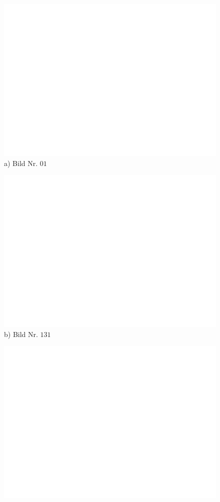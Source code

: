 \begin{figure}[H]
\centering
  \begin{minipage}{0.3\textwidth}
    \includegraphics[width=\textwidth]{images/dummy.png}
    a) Bild Nr. $01$
  \end{minipage}
  \begin{minipage}{0.3\textwidth}
    \includegraphics[width=\textwidth]{images/dummy.png}
    b) Bild Nr. $131$
  \end{minipage}
   \begin{minipage}{0.3\textwidth}
    \includegraphics[width=\textwidth]{images/dummy.png}

\end{minipage}
\end{figure}
